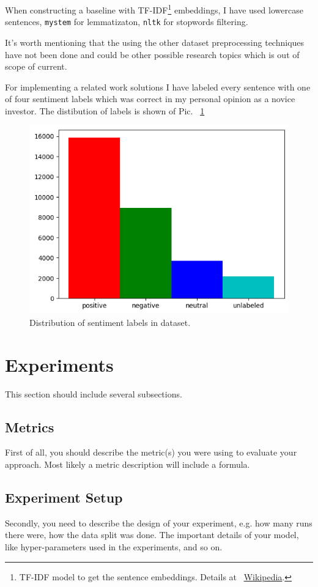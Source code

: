 \documentclass{article}
\begin{document}
When constructing a baseline with TF-IDF\footnote{TF-IDF model to get the sentence embeddings. Details at ~\href{https://ru.wikipedia.org/wiki/TF-IDF}{Wikipedia}.} embeddings, I have used lowercase sentences, \texttt{mystem} for lemmatizaton, \texttt{nltk} for stopwords filtering.

It's worth mentioning that the using the other dataset preprocessing techniques have not been done and could be other possible research topics which is out of scope of current.

For implementing a related work solutions I have labeled every sentence with one of four sentiment labels which was correct in my personal opinion as a novice investor. The distibution of labels is shown of Pic. ~\ref{fig:labels}

\begin{figure}[!tbh]
    \centering
    \includegraphics[width=0.5\linewidth]{labels.png}
    \caption{Distribution of sentiment labels in dataset.}
    \label{fig:labels}
\end{figure}



\section{Experiments}
This section should include several subsections.
\subsection{Metrics}
First of all, you should describe the metric(s) you were using to evaluate your approach. Most likely a metric description will include a formula.

\subsection{Experiment Setup}
Secondly, you need to describe the design of your experiment, e.g. how many runs there were, how the data split was done. The important details of your model, like hyper-parameters used in the experiments, and so on.
\end{document}
